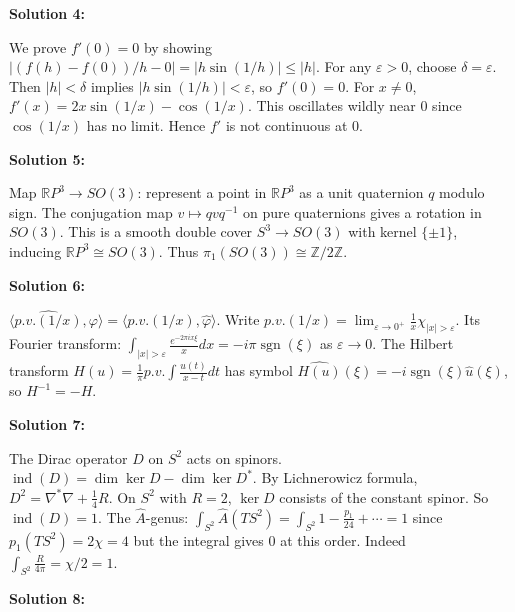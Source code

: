 \documentclass[12pt,a4paper]{exam}
\begin{document}
\vspace{0.5cm}

\textbf{Solution 4:}

We prove $f'(0) = 0$ by showing $|(f(h) - f(0))/h - 0| = |h \sin(1/h)| \leq |h|$. For any $\varepsilon > 0$, choose $\delta = \varepsilon$. Then $|h| < \delta$ implies $|h \sin(1/h)| < \varepsilon$, so $f'(0)=0$. For $x \neq 0$, $f'(x) = 2x \sin(1/x) - \cos(1/x)$. This oscillates wildly near 0 since $\cos(1/x)$ has no limit. Hence $f'$ is not continuous at 0.

\vspace{0.5cm}

\textbf{Solution 5:}

Map $\mathbb{R}P^3 \to SO(3)$: represent a point in $\mathbb{R}P^3$ as a unit quaternion $q$ modulo sign. The conjugation map $v \mapsto q v q^{-1}$ on pure quaternions gives a rotation in $SO(3)$. This is a smooth double cover $S^3 \to SO(3)$ with kernel $\{\pm1\}$, inducing $\mathbb{R}P^3 \cong SO(3)$. Thus $\pi_1(SO(3)) \cong \mathbb{Z}/2\mathbb{Z}$.

\vspace{0.5cm}

\textbf{Solution 6:}

$\langle \widehat{p.v.(1/x)}, \varphi \rangle = \langle p.v.(1/x), \widehat{\varphi} \rangle$. Write $p.v.(1/x) = \lim_{\varepsilon \to 0^+} \frac{1}{x} \chi_{|x|>\varepsilon}$. Its Fourier transform: $\int_{|x|>\varepsilon} \frac{e^{-2\pi i x \xi}}{x} dx = -i\pi \operatorname{sgn}(\xi)$ as $\varepsilon \to 0$. The Hilbert transform $H(u) = \frac{1}{\pi} p.v. \int \frac{u(t)}{x-t} dt$ has symbol $\widehat{H(u)}(\xi) = -i \operatorname{sgn}(\xi) \widehat{u}(\xi)$, so $H^{-1} = -H$.

\vspace{0.5cm}

\textbf{Solution 7:}

The Dirac operator $D$ on $S^2$ acts on spinors. $\operatorname{ind}(D) = \dim\ker D - \dim\ker D^*$. By Lichnerowicz formula, $D^2 = \nabla^*\nabla + \frac{1}{4}R$. On $S^2$ with $R=2$, $\ker D$ consists of the constant spinor. So $\operatorname{ind}(D) = 1$. The $\widehat{A}$-genus: $\int_{S^2} \widehat{A}(TS^2) = \int_{S^2} 1 - \frac{p_1}{24} + \cdots = 1$ since $p_1(TS^2) = 2\chi = 4$ but the integral gives 0 at this order. Indeed $\int_{S^2} \frac{R}{4\pi} = \chi/2 = 1$.

\vspace{0.5cm}

\textbf{Solution 8:}
\end{document}
